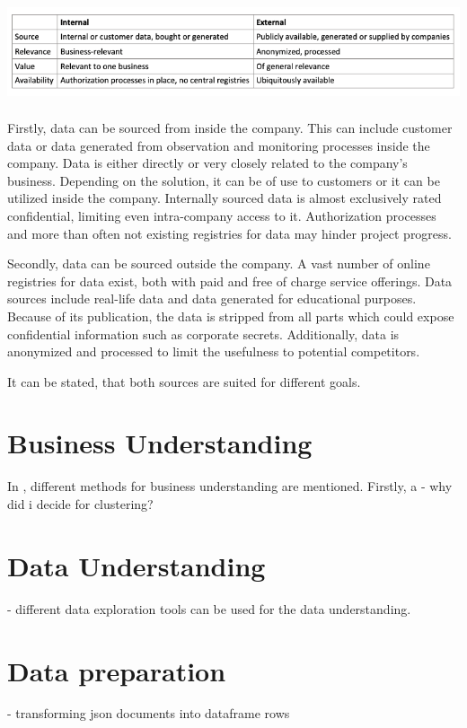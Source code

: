 	\includegraphics[height=3cm]{Bilder/internal_external.png}
	
	Firstly, data can be sourced from inside the company. This can include customer data or data generated from observation and monitoring processes inside the company. Data is either directly or very closely related to the company's business. Depending on the solution, it can be of use to customers or it can be utilized inside the company. Internally sourced data is almost exclusively rated confidential, limiting even intra-company access to it. Authorization processes and more than often not existing registries for data may hinder project progress.
	
	Secondly, data can be sourced outside the company. A vast number of online registries for data exist, both with paid and free of charge service offerings. Data sources include real-life data and data generated for educational purposes. Because of its publication, the data is stripped from all parts which could expose confidential information such as corporate secrets. Additionally, data is anonymized and processed to limit the usefulness to potential competitors.
	
	It can be stated, that both sources are suited for different goals. 

\section{Business Understanding}
	In \cite{CRISPDM2000}, different methods for business understanding are mentioned. Firstly, a 
	- why did i decide for clustering?

\section{Data Understanding}
	- different data exploration tools can be used for the data understanding.

\section{Data preparation}
- transforming json documents into dataframe rows

